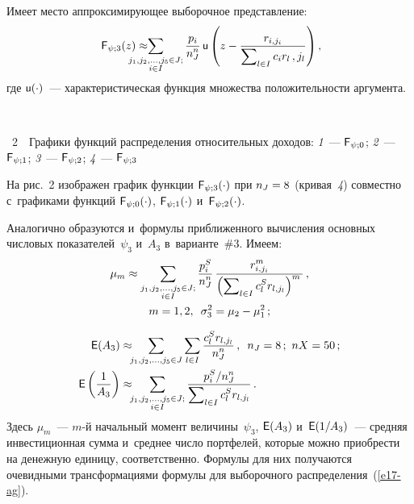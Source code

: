 \begin{multicols}{2}
  Имеет место аппроксимирующее выборочное представление: 
  \begin{equation}
{\sf F}_{\psi;3}(z)\approx \hspace*{-7mm}
  \sum\limits_{\substack{{j_1, j_2, \ldots, j_5\in J;}\\{i\in I}} }
\fr{p_i}{n_J^n}\, {\sf u}\left(z-
\fr{r_{i,j_i}}{\sum\nolimits_{l\in I} 
  c_i r_{l}\,, 
j_{l}}\right),\!\!
  \label{e17-ag}
  \end{equation}
где ${\sf u}(\cdot)$~--- характеристическая функция множества 
положительности аргумента. 

 { \begin{center}  %
 \vspace*{-1pt}
  \mbox{%
 \epsfxsize=77.698mm 
 }

\end{center}


\noindent
{{\figurename~2}\ \ \small{Графики функций распределения относительных доходов:
\textit{1}~--- ${\sf F}_{\psi;0}$; \textit{2}~--- ${\sf F}_{\psi;1}$;
\textit{3}~--- ${\sf F}_{\psi;2}$; \textit{4}~--- ${\sf F}_{\psi;3}$}
}

}

\vspace*{12pt}
  
  На рис.~2 изображен график функции ${\sf F}_{\psi;3}(\cdot)$ при $n_J\hm=8$ 
(кривая~\textit{4}) совместно с~графиками функций  
${\sf F}_{\psi;0}(\cdot)$, ${\sf F}_{\psi;1}(\cdot)$ и~${\sf F}_{\psi;2}(\cdot)$.
  
  Аналогично образуются и~формулы приближенного вычисления основных 
числовых показателей~$\psi_3$ и~$A_3$ в~варианте~\#3. Имеем:
  \begin{multline*}
  \mu_m\approx \sum\limits_{\substack{
  {j_1,j_2,\ldots,j_5\in J;}\\ {i\in I}}} \displaystyle\frac{\displaystyle p_i^S\mathstrut}{\displaystyle n_J^n\mathstrut}\, 
\displaystyle\frac{\displaystyle r^m_{i,j_i}\mathstrut}{\displaystyle \left( \sum\nolimits_{l\in I} c_l^S r_{l,j_l}\right)^m\mathstrut}\,,\\
  m=1,2,\enskip  \sigma_3^2=\mu_2-\mu_1^2\,; 
   \end{multline*}
   
   \noindent
   \begin{align*}
   {\sf E} (A_3) &\approx \hspace*{-4.5pt}\sum\limits_{j_1,j_2, \ldots, j_5\in J} 
   \sum\limits_{l\in I} \displaystyle\frac{\displaystyle c_l^S 
r_{l,j_l}\mathstrut}{\displaystyle n_J^n\mathstrut}\,,\enskip n_J=8\,; \ nX=50\,;
   \\
  {\sf E}\left(\displaystyle\frac{\displaystyle 1\mathstrut}{\displaystyle A_3\mathstrut}\right)&\approx \hspace*{-4.5pt}
  \sum\limits_{\substack{{j_1,j_2, \ldots,j_5\in J;}\\ {i\in I}}} 
\displaystyle\frac{\displaystyle p_i^S/n_J^n\mathstrut}{\displaystyle \sum\nolimits_{l\in I} c_l^S r_{l,j_l}\mathstrut}\,.
 \end{align*}
  Здесь $\mu_m$~--- $m$-й начальный момент величины~$\psi_3$, ${\sf E}(A_3)$ и~${\sf E}(1/A_3)$~--- средняя инвестиционная сумма и~среднее 
число портфелей, которые можно приобрести на денежную единицу, 
соответственно. Формулы для них получаются очевидными трансформациями 
формулы для выборочного распределения~(\ref{e17-ag}).
   

\end{multicols}
